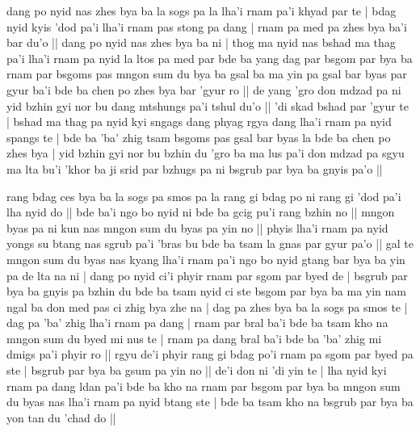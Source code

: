 \documentclass[11pt,twoside]{article}\makeatletter
\begin{document}
\par
\label{TV9}dang po nyid nas zhes bya ba la sogs pa la lha'i rnam pa'i khyad par te | bdag nyid kyis 'dod pa'i lha'i rnam pas stong pa dang | rnam pa med pa zhes bya ba'i bar du'o || dang po nyid nas zhes bya ba ni | thog ma nyid nas bshad ma thag pa'i lha'i rnam pa nyid la ltos pa med par bde ba yang dag par bsgom par bya ba rnam par bsgoms pas mngon sum du bya ba gsal ba ma yin pa gsal bar byas par gyur ba'i bde ba chen po zhes bya bar 'gyur ro || de yang 'gro don mdzad pa ni yid bzhin gyi nor bu dang mtshungs pa'i tshul du'o || 'di skad bshad par 'gyur te | bshad ma thag pa nyid kyi sngags dang phyag rgya dang lha'i rnam pa nyid spangs te | bde ba 'ba' zhig tsam bsgoms pas gsal bar byas la bde ba chen po zhes bya | yid bzhin gyi nor bu bzhin du 'gro ba ma lus pa'i don mdzad pa sgyu ma lta bu'i 'khor ba ji srid par bzhugs pa ni bsgrub par bya ba gnyis pa'o || 
\par
\label{TV10}rang bdag ces bya ba la sogs pa smos pa la rang gi bdag po ni rang gi 'dod pa'i lha nyid do || bde ba'i ngo bo nyid ni bde ba gcig pu'i rang bzhin no || mngon byas pa ni kun nas mngon sum du byas pa yin no || phyis lha'i rnam pa nyid yongs su btang nas sgrub pa'i 'bras bu bde ba tsam la gnas par gyur pa'o || gal te mngon sum du byas nas kyang lha'i rnam pa'i ngo bo nyid gtang bar bya ba yin pa de lta na ni | dang po nyid ci'i phyir rnam par sgom par byed de | bsgrub par bya ba gnyis pa bzhin du bde ba tsam nyid ci ste bsgom par bya ba ma yin nam ngal ba don med pas ci zhig bya zhe na | dag pa zhes bya ba la sogs pa smos te | dag pa 'ba' zhig lha'i rnam pa dang | rnam par bral ba'i bde ba tsam kho na mngon sum du byed mi nus te | rnam pa dang bral ba'i bde ba 'ba' zhig mi dmigs pa'i phyir ro || rgyu de'i phyir rang gi bdag po'i rnam pa sgom par byed pa ste | bsgrub par bya ba gsum pa yin no || de'i don ni 'di yin te | lha nyid kyi rnam pa dang ldan pa'i bde ba kho na rnam par bsgom par bya ba mngon sum du byas nas lha'i rnam pa nyid  btang ste | bde ba tsam kho na bsgrub par bya ba yon tan du 'chad do ||
\end{document}

